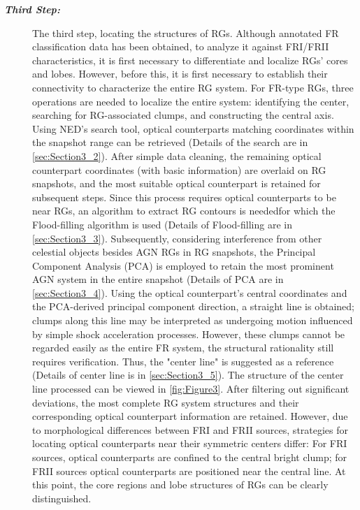\documentclass{aa}
\begin{document}
\begin{description}
    \item[\textbf{\textit{Third Step:}}]
    The third step, locating the structures of RGs. Although annotated FR classification data has been obtained, to analyze it against FRI/FRII characteristics, it is first necessary to differentiate and localize RGs’ cores and lobes. However, before this, it is first necessary to establish their connectivity to characterize the entire RG system. For FR-type RGs, three operations are needed to localize the entire system: identifying the center, searching for RG-associated clumps, and constructing the central axis. Using NED’s search tool, optical counterparts matching coordinates within the snapshot range can be retrieved (Details of the search are in \autoref{sec:Section3_2}). After simple data cleaning, the remaining optical counterpart coordinates (with basic information) are overlaid on RG snapshots, and the most suitable optical counterpart is retained for subsequent steps. Since this process requires optical counterparts to be near RGs, an algorithm to extract RG contours is needed\textemdash for which the Flood-filling algorithm is used (Details of Flood-filling are in \autoref{sec:Section3_3}). Subsequently, considering interference from other celestial objects besides AGN RGs in RG snapshots, the Principal Component Analysis (PCA) is employed to retain the most prominent AGN system in the entire snapshot (Details of PCA are in \autoref{sec:Section3_4}). Using the optical counterpart’s central coordinates and the PCA-derived principal component direction, a straight line is obtained; clumps along this line may be interpreted as undergoing motion influenced by simple shock acceleration processes. However, these clumps cannot be regarded easily as the entire FR system, the structural rationality still requires verification. Thus, the "center line" is suggested as a reference (Details of center line is in \autoref{sec:Section3_5}). The structure of the center line processed can be viewed in \autoref{fig:Figure3}. After filtering out significant deviations, the most complete RG system structures and their corresponding optical counterpart information are retained. However, due to morphological differences between FRI and FRII sources, strategies for locating optical counterparts near their symmetric centers differ: For FRI sources, optical counterparts are confined to the central bright clump; for FRII sources optical counterparts are positioned near the central line. At this point, the core regions and lobe structures of RGs can be clearly distinguished.



\end{description}
\end{document}
